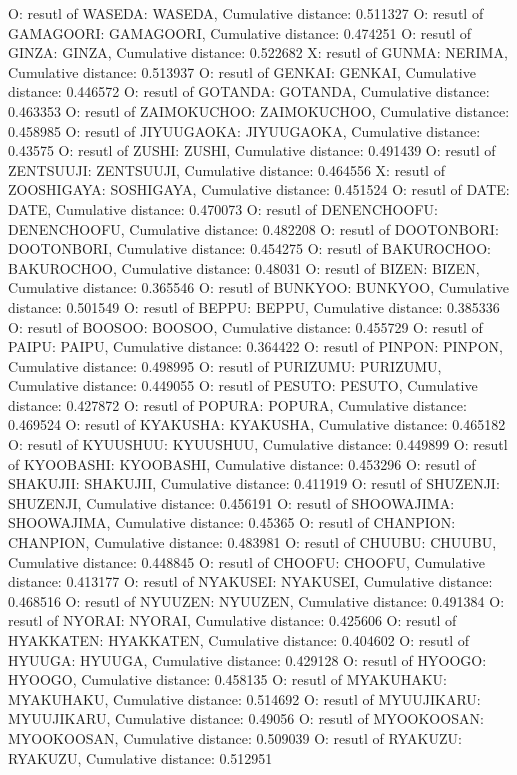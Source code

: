 O: resutl of WASEDA: WASEDA, Cumulative distance: 0.511327
O: resutl of GAMAGOORI: GAMAGOORI, Cumulative distance: 0.474251
O: resutl of GINZA: GINZA, Cumulative distance: 0.522682
X: resutl of GUNMA: NERIMA, Cumulative distance: 0.513937
O: resutl of GENKAI: GENKAI, Cumulative distance: 0.446572
O: resutl of GOTANDA: GOTANDA, Cumulative distance: 0.463353
O: resutl of ZAIMOKUCHOO: ZAIMOKUCHOO, Cumulative distance: 0.458985
O: resutl of JIYUUGAOKA: JIYUUGAOKA, Cumulative distance: 0.43575
O: resutl of ZUSHI: ZUSHI, Cumulative distance: 0.491439
O: resutl of ZENTSUUJI: ZENTSUUJI, Cumulative distance: 0.464556
X: resutl of ZOOSHIGAYA: SOSHIGAYA, Cumulative distance: 0.451524
O: resutl of DATE: DATE, Cumulative distance: 0.470073
O: resutl of DENENCHOOFU: DENENCHOOFU, Cumulative distance: 0.482208
O: resutl of DOOTONBORI: DOOTONBORI, Cumulative distance: 0.454275
O: resutl of BAKUROCHOO: BAKUROCHOO, Cumulative distance: 0.48031
O: resutl of BIZEN: BIZEN, Cumulative distance: 0.365546
O: resutl of BUNKYOO: BUNKYOO, Cumulative distance: 0.501549
O: resutl of BEPPU: BEPPU, Cumulative distance: 0.385336
O: resutl of BOOSOO: BOOSOO, Cumulative distance: 0.455729
O: resutl of PAIPU: PAIPU, Cumulative distance: 0.364422
O: resutl of PINPON: PINPON, Cumulative distance: 0.498995
O: resutl of PURIZUMU: PURIZUMU, Cumulative distance: 0.449055
O: resutl of PESUTO: PESUTO, Cumulative distance: 0.427872
O: resutl of POPURA: POPURA, Cumulative distance: 0.469524
O: resutl of KYAKUSHA: KYAKUSHA, Cumulative distance: 0.465182
O: resutl of KYUUSHUU: KYUUSHUU, Cumulative distance: 0.449899
O: resutl of KYOOBASHI: KYOOBASHI, Cumulative distance: 0.453296
O: resutl of SHAKUJII: SHAKUJII, Cumulative distance: 0.411919
O: resutl of SHUZENJI: SHUZENJI, Cumulative distance: 0.456191
O: resutl of SHOOWAJIMA: SHOOWAJIMA, Cumulative distance: 0.45365
O: resutl of CHANPION: CHANPION, Cumulative distance: 0.483981
O: resutl of CHUUBU: CHUUBU, Cumulative distance: 0.448845
O: resutl of CHOOFU: CHOOFU, Cumulative distance: 0.413177
O: resutl of NYAKUSEI: NYAKUSEI, Cumulative distance: 0.468516
O: resutl of NYUUZEN: NYUUZEN, Cumulative distance: 0.491384
O: resutl of NYORAI: NYORAI, Cumulative distance: 0.425606
O: resutl of HYAKKATEN: HYAKKATEN, Cumulative distance: 0.404602
O: resutl of HYUUGA: HYUUGA, Cumulative distance: 0.429128
O: resutl of HYOOGO: HYOOGO, Cumulative distance: 0.458135
O: resutl of MYAKUHAKU: MYAKUHAKU, Cumulative distance: 0.514692
O: resutl of MYUUJIKARU: MYUUJIKARU, Cumulative distance: 0.49056
O: resutl of MYOOKOOSAN: MYOOKOOSAN, Cumulative distance: 0.509039
O: resutl of RYAKUZU: RYAKUZU, Cumulative distance: 0.512951
